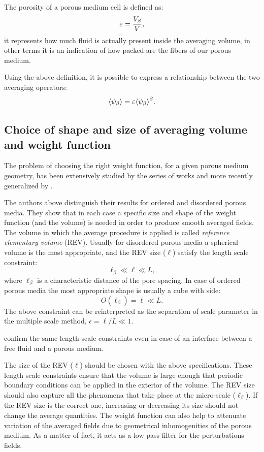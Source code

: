 The porosity of a porous medium cell is defined as:
\begin{equation}
	\varepsilon = \dfrac{V_\beta}{V},
	\label{eq:porosity}
\end{equation}
it represents how much fluid is actually present inside the averaging volume, in other terms it is an indication of how packed are the fibers of our porous medium.

Using the above definition, it is possible to express a relationship between the two averaging operators:
\begin{equation}
	{\left< \psi_{\beta} \right>} =  \varepsilon {\left< \psi_{\beta} \right>}^{\beta}.
	\label{eq:means_vs_meani}
\end{equation}

\subsection{Choice of shape and size of averaging volume and weight function}
\label{ch:filter}

The problem of choosing the right weight function, for a given porous medium geometry, has been extensively studied by the series of works \citet{quintard1994transport1} \cite{quintard1994transport2} \cite{quintard1994transport3} \cite{quintard1994transport4} \cite{quintard1994transport5} and more recently generalized by \citet{davit2017technical}.

The authors above distinguish their results for ordered and disordered porous media. They show that in each case a specific size and shape of the weight function (and the volume) is needed in order to produce smooth averaged fields.
The volume in which the average procedure is applied is called \textit{reference elementary volume} (REV).
Usually for disordered porous media a spherical volume is the most appropriate, and the REV size ($\ell$) satisfy the length scale constraint:
$$
\ell_{\beta} \ll \ell \ll L,
$$
where $\ell_{\beta}$ is a characteristic distance of the pore spacing. 
In case of ordered porous media the most appropriate shape is usually a cube with side:
$$
O(\ell_{\beta}) = \ell \ll L.
$$
The above constraint can be reinterpreted as the separation of scale parameter in the multiple scale method, $\epsilon = \ell/L \ll 1$.

\citet{ochoa1995momentum} confirm the same length-scale constraints even in case of an interface between a free fluid and a porous medium.

The size of the REV ($\ell$) should be chosen with the above specifications. These length scale constraints ensure that the volume is large enough that periodic boundary conditions can be applied in the exterior of the volume. The REV size should also capture all the phenomena that take place at the micro-scale ($\ell_{\beta}$).
If the REV size is the correct one, increasing or decreasing its size should not change the average quantities. The weight function can also help to attenuate variation of the averaged fields due to geometrical inhomogenities of the porous medium. As a matter of fact, it acts as a low-pass filter for the perturbations fields.

